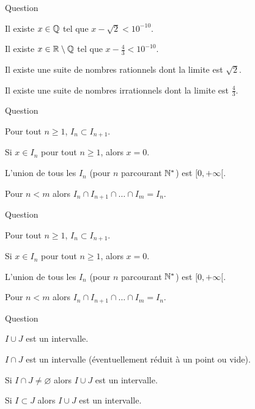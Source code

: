 \begin{multi}[multiple,feedback=
{Tout est vrai ! Ce sont des conséquences de la densité de \(\Qq\) dans \(\Rr\) et de la densité de \(\Rr \setminus \Qq\) dans \(\Rr\).
}]{Question}
    \item* Il existe \(x\in\mathbb{Q}\) tel que \(x-\sqrt2 < 10^{-10}\).
    \item* Il existe \(x\in\mathbb{R}\setminus\mathbb{Q}\) tel que \(x-\frac43 < 10^{-10}\).
    \item* Il existe une suite de nombres rationnels dont la limite est \(\sqrt 2\).
    \item* Il existe une suite de nombres irrationnels dont la limite est \(\frac43\).
\end{multi}


\begin{multi}[multiple,feedback=
{On a \([0,1] = I_1 \supset I_2 \supset I_3 \supset \cdots\).
}]{Question}
    \item Pour tout \(n\ge 1\), \(I_n \subset I_{n+1}\).
    \item* Si \(x \in I_n\) pour tout \(n\ge1\), alors \(x=0\).
    \item L'union de tous les \(I_n\) (pour \(n\) parcourant \(\mathbb{N}^*\)) est \([0,+\infty[\).
    \item Pour \(n < m\) alors \(I_n \cap I_{n+1} \cap \ldots \cap I_m = I_n\).
\end{multi}


\begin{multi}[multiple,feedback=
{On a \([0,1] = I_1 \subset I_2 \subset I_3 \subset \cdots\).
}]{Question}
    \item* Pour tout \(n\ge 1\), \(I_n \subset I_{n+1}\).
    \item Si \(x \in I_n\) pour tout \(n\ge1\), alors \(x=0\).
    \item* L'union de tous les \(I_n\) (pour \(n\) parcourant \(\mathbb{N}^*\)) est \([0,+\infty[\).
    \item* Pour \(n < m\) alors \(I_n \cap I_{n+1} \cap \ldots \cap I_m = I_n\).
\end{multi}


\begin{multi}[multiple,feedback=
{Tracer les intervalles sur la droite réelle pour mieux comprendre.
Une union d'intervalles n'est en général pas un intervalle !
}]{Question}
    \item \(I \cup J\) est un intervalle.
    \item* \(I \cap J\) est un intervalle (éventuellement réduit à un point ou vide).
    \item* Si \(I \cap J \neq \varnothing\) alors \(I \cup J\) est un intervalle.
    \item* Si \(I \subset J\) alors \(I \cup J\) est un intervalle.
\end{multi}


